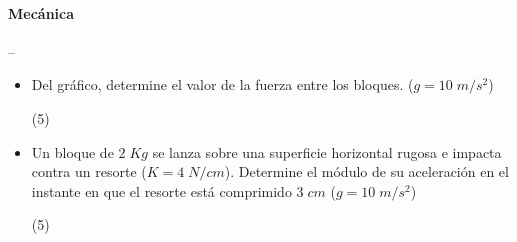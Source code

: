 \documentclass[11pt, twocolumn, landscape, a4paper]{article}
\begin{document}
\paragraph*{Mecánica} -- \\
\begin{itemize}
\item{Del gráfico, determine el valor de la fuerza entre los bloques. ($g = 10\;m/s^2$)
\begin{tasks}(5)
\end{tasks}
}

\item{Un bloque de $2\;{Kg}$ se lanza sobre una superficie horizontal rugosa e impacta contra un resorte ($K = 4\;N/cm$). Determine el módulo de su aceleración en el instante en que el resorte está comprimido $3\;cm$ ($g = 10\;m/s^2$)
\begin{tasks}(5)
\end{tasks}
}
\end{itemize}
\end{document}
